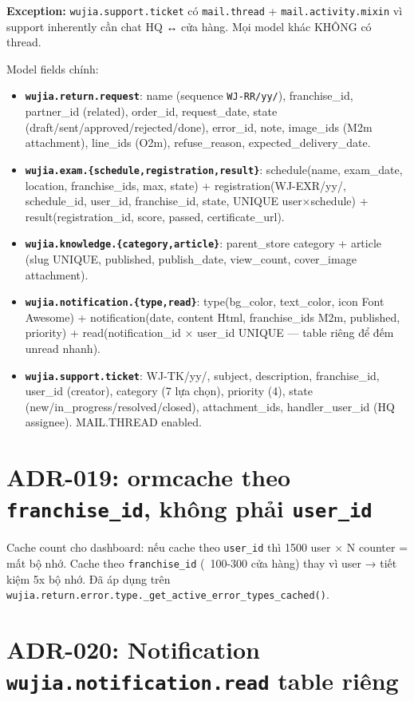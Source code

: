 \textbf{Exception:} \texttt{wujia.support.ticket} có \texttt{mail.thread} + \texttt{mail.activity.mixin} vì support inherently cần chat HQ ↔ cửa hàng. Mọi model khác KHÔNG có thread.

Model fields chính:

\begin{itemize}
    \item \textbf{\texttt{wujia.return.request}}: name (sequence \texttt{WJ-RR/yy/}), franchise\_id, partner\_id (related), order\_id, request\_date, state (draft/sent/approved/rejected/done), error\_id, note, image\_ids (M2m attachment), line\_ids (O2m), refuse\_reason, expected\_delivery\_date.
    \item \textbf{\texttt{wujia.exam.\{schedule,registration,result\}}}: schedule(name, exam\_date, location, franchise\_ids, max, state) + registration(WJ-EXR/yy/, schedule\_id, user\_id, franchise\_id, state, UNIQUE user×schedule) + result(registration\_id, score, passed, certificate\_url).
    \item \textbf{\texttt{wujia.knowledge.\{category,article\}}}: parent\_store category + article (slug UNIQUE, published, publish\_date, view\_count, cover\_image attachment).
    \item \textbf{\texttt{wujia.notification.\{type,read\}}}: type(bg\_color, text\_color, icon Font Awesome) + notification(date, content Html, franchise\_ids M2m, published, priority) + read(notification\_id × user\_id UNIQUE — table riêng để đếm unread nhanh).
    \item \textbf{\texttt{wujia.support.ticket}}: WJ-TK/yy/, subject, description, franchise\_id, user\_id (creator), category (7 lựa chọn), priority (4), state (new/in\_progress/resolved/closed), attachment\_ids, handler\_user\_id (HQ assignee). MAIL.THREAD enabled.
\end{itemize}

\section{ADR-019: ormcache theo \texttt{franchise\_id}, không phải \texttt{user\_id}}

Cache count cho dashboard: nếu cache theo \texttt{user\_id} thì 1500 user × N counter = mất bộ nhớ. Cache theo \texttt{franchise\_id} (~100-300 cửa hàng) thay vì user → tiết kiệm 5x bộ nhớ. Đã áp dụng trên \texttt{wujia.return.error.type.\_get\_active\_error\_types\_cached()}.

\section{ADR-020: Notification \texttt{wujia.notification.read} table riêng}

